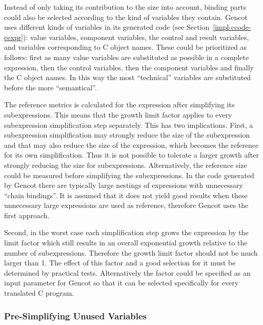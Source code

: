 Instead of only taking its contribution to the size into account, binding parts could also be selected according to the kind of
variables they contain. 
Gencot uses different kinds of variables in its generated code (see Section~\ref{impl-ccode-cexpr}): value variables, component
variables, the control and result variables, and variables corresponding to C object names. These could be prioritized
as follows: first as many value 
variables are substituted as possible in a complete expression, then the control variables, then the component variables and
finally the C object names. In this way the most ``technical'' variables are substituted before the more ``semantical''.

The reference metrics is calculated for the expression after simplifying its subexpressions. This means that the growth limit factor
applies to every subexpression simplification step separately. This has two implications. First, a subexpression simplification
may strongly reduce the size of the subexpression and that may also reduce the size of the  expression, which becomes 
the reference for its own simplification. Thus it is not possible to tolerate a larger growth after strongly reducing the size for
subexpressions. Alternatively, the reference size could be measured before simplifying the subexpressions. In the code generated
by Gencot there are typically large nestings of  expressions with unnecessary ``chain bindings''. It is assumed that it
does not yield good results when these unnecessary large expressions are used as reference, therefore Gencot uses the first approach.

Second, in the worst case each simplification step grows the expression by the limit factor which still results in an overall exponential growth
relative to the number of subexpressions. Therefore the growth limit factor should not be much larger than 1. The effect of this
factor and a good selection for it must be determined by practical tests. Alternatively the factor could be specified as an input 
parameter for Gencot so that it can be selected specifically for every translated C program.

\subsubsection{Pre-Simplifying Unused Variables}

